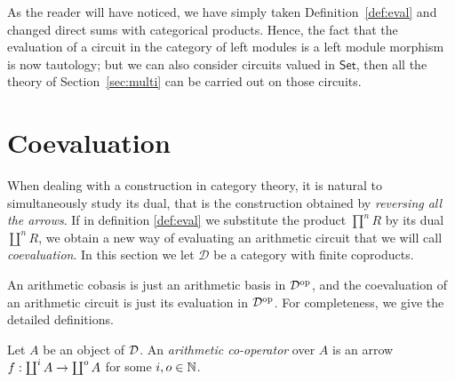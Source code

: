 As the reader will have noticed, we have simply taken
Definition~\ref{def:eval} and changed direct sums with categorical
products. Hence, the fact that the evaluation of a circuit in the
category of left modules is a left module morphism is now tautology;
but we can also consider circuits valued in $\mathsf{Set}$, then all
the theory of Section~\ref{sec:multi} can be carried out on those
circuits.
  


\section{Coevaluation}
When dealing with a construction in category theory, it is natural to
simultaneously study its dual, that is the construction obtained by
\emph{reversing all the arrows}. If in definition \ref{def:eval} we
substitute the product $\prod^nR$ by its dual $\coprod^nR$, we obtain
a new way of evaluating an arithmetic circuit that we will call
\emph{coevaluation}. In this section we let $\mathcal{D}$ be a
category with finite coproducts.

An arithmetic cobasis is just an arithmetic basis in $\mathcal{D}^{\mathrm{op}}$, and the
coevaluation of an arithmetic circuit is just its evaluation in
$\mathcal{D}^{\mathrm{op}}$. For completeness, we give the detailed definitions.

\begin{definition}
  Let $A$ be an object of $\mathcal{D}$.  An \emph{arithmetic co-operator} over
  $A$ is an arrow $f:\coprod^iA\rightarrow\coprod^oA$ for some $i,o\in\mathbb{N}$.
\end{definition}

